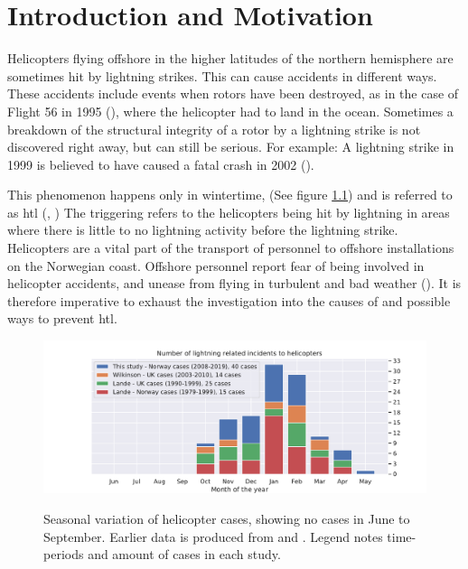 \chapter{Introduction and Motivation}\label{ch:introduction}
Helicopters flying offshore in the higher latitudes of the northern hemisphere are sometimes hit by lightning strikes. This can cause accidents in different ways. These accidents include events when rotors have been destroyed, as in the case of Flight 56 in 1995 (\cite{flight56}), where the helicopter had to land in the ocean. Sometimes a breakdown of the structural integrity of a rotor by a lightning strike is not discovered right away, but can still be serious. For example: A lightning strike in 1999 is believed to have caused a fatal crash in 2002 (\cite{laterhit}). 

This phenomenon happens only in wintertime, (See figure \ref{fig:landewilk}) and is referred to as \acrfull{htl} (\cite{lande}, \cite{wilkinson}) The triggering refers to the helicopters being hit by lightning in areas where there is little to no lightning activity before the lightning strike. Helicopters are a vital part of the transport of personnel to offshore installations on the Norwegian coast. Offshore personnel report fear of being involved in helicopter accidents, and unease from flying in turbulent and bad weather (\cite{wasilewska}). It is therefore imperative to exhaust the investigation into the causes of and possible ways to prevent \acrshort{htl}. 

\begin{figure}
    \centering
    \caption{Seasonal variation of helicopter cases, showing no cases in June to September. Earlier data is produced from \cite{lande} and \cite{wilkinson}. Legend notes time-periods and amount of cases in each study.}
    \includegraphics[width=\textwidth]{Figures/yearlydistribution.pdf}
    \label{fig:landewilk}
\end{figure}

